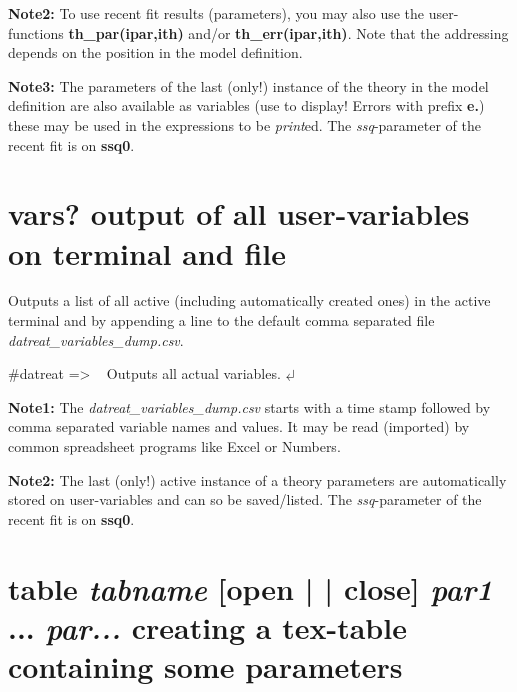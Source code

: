 \documentclass[11pt,fleqn]{book} %
\newcommand{\linespace}{\vspace{4ex}}
\newcommand{\return}{$\carriagereturn$} %
\newcommand{\sysprompt}{{\color{green}...\textgreater} ~ }
\newcommand{\dtrprompt}{{\color{blue}\#datreat =\textgreater} ~ }
\newcommand{\enter}[1]{{\color{red} \bf #1}}
\newcommand{\cmdl}[2]{{\color{red}{\bf \underline{#1} #2}}}
\newcommand{\var}[1]{{\color{red} \bf \it #1}}
\newcommand{\desc}[1]{\hskip 0.5cm {\color{descgray} #1}}
\newcommand{\expl}[1]{\hskip 0.5cm {\color{explgray} #1}}
\begin{document}
\linespace
{\bf Note2:} To use recent fit results (parameters), you may also use the user-functions {\bf th\_par(ipar,ith)} and/or
{\bf th\_err(ipar,ith)}. Note that the addressing depends on the position in the model definition.

\linespace
{\bf Note3:} The parameters of the last (only!) instance of the theory in the model definition
are also available as variables (use \cmdl{vars?}{} to display! Errors with prefix {\bf e.}) these may
be used in the expressions to be \emph{print}ed. The \emph{ssq}-parameter of the recent fit is on
{\bf ssq0}.


\section{vars?   \desc{output of all user-variables on terminal and file }}

\begin{exercise}
Outputs a list of all active (including automatically created ones) in the active terminal and
by appending a line to the default comma separated file \textit{datreat\_variables\_dump.csv}.
\end{exercise}

\begin{corollary}
\dtrprompt \cmdl{print}{vars?}  \expl{Outputs all actual variables.}  \return  
\end{corollary}

\linespace
{\bf Note1:} The \textit{datreat\_variables\_dump.csv} starts with a time stamp followed by comma separated
variable names and values. It may be read (imported) by common spreadsheet programs like Excel or Numbers.
 
\linespace
{\bf Note2:} The last (only!) active instance of a theory parameters are 
automatically stored on user-variables and 
can so be saved/listed. The \emph{ssq}-parameter of the recent fit is on
{\bf ssq0}.

\section{table \var{tabname} [open | | close] \var{par1} ... \var{par...}  \desc{creating a tex-table containing some parameters}}
\end{document}
